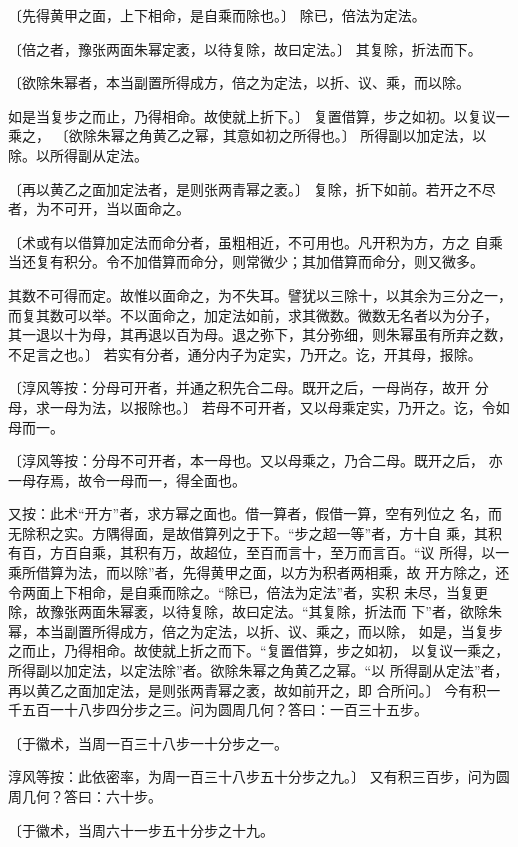 \documentclass[a4paper,12pt,UTF8,twoside]{ctexbook}
\begin{document}
〔先得黄甲之面，上下相命，是自乘而除也。〕 除已，倍法为定法。

〔倍之者，豫张两面朱幂定袤，以待复除，故曰定法。〕 其复除，折法而下。

〔欲除朱幂者，本当副置所得成方，倍之为定法，以折、议、乘，而以除。

如是当复步之而止，乃得相命。故使就上折下。〕 复置借算，步之如初。以复议一乘之， 〔欲除朱幂之角黄乙之幂，其意如初之所得也。〕 所得副以加定法，以除。以所得副从定法。

〔再以黄乙之面加定法者，是则张两青幂之袤。〕 复除，折下如前。若开之不尽者，为不可开，当以面命之。

〔术或有以借算加定法而命分者，虽粗相近，不可用也。凡开积为方，方之 自乘当还复有积分。令不加借算而命分，则常微少；其加借算而命分，则又微多。

其数不可得而定。故惟以面命之，为不失耳。譬犹以三除十，以其余为三分之一， 而复其数可以举。不以面命之，加定法如前，求其微数。微数无名者以为分子， 其一退以十为母，其再退以百为母。退之弥下，其分弥细，则朱幂虽有所弃之数， 不足言之也。〕 若实有分者，通分内子为定实，乃开之。讫，开其母，报除。

〔淳风等按：分母可开者，并通之积先合二母。既开之后，一母尚存，故开 分母，求一母为法，以报除也。〕 若母不可开者，又以母乘定实，乃开之。讫，令如母而一。

〔淳风等按：分母不可开者，本一母也。又以母乘之，乃合二母。既开之后， 亦一母存焉，故令一母而一，得全面也。

又按：此术“开方”者，求方幂之面也。借一算者，假借一算，空有列位之 名，而无除积之实。方隅得面，是故借算列之于下。“步之超一等”者，方十自 乘，其积有百，方百自乘，其积有万，故超位，至百而言十，至万而言百。“议 所得，以一乘所借算为法，而以除”者，先得黄甲之面，以方为积者两相乘，故 开方除之，还令两面上下相命，是自乘而除之。“除已，倍法为定法”者，实积 未尽，当复更除，故豫张两面朱幂袤，以待复除，故曰定法。“其复除，折法而 下”者，欲除朱幂，本当副置所得成方，倍之为定法，以折、议、乘之，而以除， 如是，当复步之而止，乃得相命。故使就上折之而下。“复置借算，步之如初， 以复议一乘之，所得副以加定法，以定法除”者。欲除朱幂之角黄乙之幂。“以 所得副从定法”者，再以黄乙之面加定法，是则张两青幂之袤，故如前开之，即 合所问。〕 今有积一千五百一十八步四分步之三。问为圆周几何？答曰：一百三十五步。

〔于徽术，当周一百三十八步一十分步之一。

淳风等按：此依密率，为周一百三十八步五十分步之九。〕 又有积三百步，问为圆周几何？答曰：六十步。

〔于徽术，当周六十一步五十分步之十九。
\end{document}
